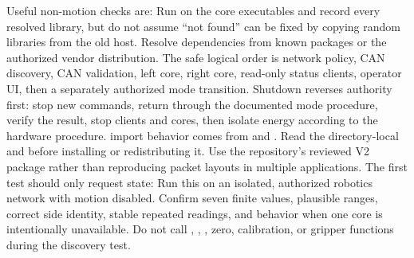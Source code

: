 \markdownRendererOlEnd \markdownRendererInterblockSeparator
{}Useful non-motion checks are:\markdownRendererInterblockSeparator
{}\markdownRendererInterblockSeparator
{}Run  on the core executables and record every resolved library, but do not assume “not found” can be fixed by copying random libraries from the old host. Resolve dependencies from known packages or the authorized vendor distribution.\markdownRendererInterblockSeparator
{}
\markdownRendererSectionEnd \markdownRendererSectionBegin
{}\markdownRendererInterblockSeparator
{}The safe logical order is network policy, CAN discovery, CAN validation, left core, right core, read-only status clients, operator UI, then a separately authorized mode transition. Shutdown reverses authority first: stop new commands, return through the documented mode procedure, verify the result, stop clients and cores, then isolate energy according to the hardware procedure.\markdownRendererInterblockSeparator
{}
\markdownRendererSectionEnd 
\markdownRendererSectionEnd \markdownRendererSectionBegin
{}\markdownRendererInterblockSeparator
{}\markdownRendererBlockQuoteBegin
{} import behavior comes from  and . Read the directory-local  and  before installing or redistributing it.\markdownRendererBlockQuoteEnd \markdownRendererInterblockSeparator
{}Use the repository's reviewed V2 package rather than reproducing packet layouts in multiple applications. The first test should only request state:\markdownRendererInterblockSeparator
{}\markdownRendererInterblockSeparator
{}Run this on an isolated, authorized robotics network with motion disabled. Confirm seven finite values, plausible ranges, correct side identity, stable repeated readings, and behavior when one core is intentionally unavailable. Do not call , , , zero, calibration, or gripper functions during the discovery test.\markdownRendererParagraphSeparator
